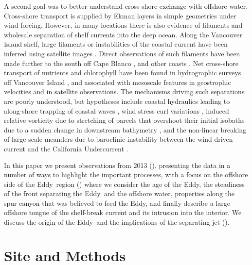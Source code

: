 \documentclass[draft]{agujournal2019}
\newcommand*{\Eddy}{{\sc Eddy}}
\begin{document}
A second goal was to better understand cross-shore exchange with offshore water.  Cross-shore transport is supplied by Ekman layers in simple geometries under wind forcing. However, in many locations there is also evidence of filaments and wholesale separation of shelf currents into the deep ocean.  Along the Vancouver Island shelf, large filaments or instabilities of the coastal current have been inferred using satellite images \cite{ikedaemery84,thomsongower98}.  Direct observations of such filaments have been made further to the south off Cape Blanco \cite{barthetal00}, and other coasts \cite[e.g.]{relvasbarton05}. Net cross-shore transport of nutrients and chlorophyll have been found in hydrographic surveys off Vancouver Island \cite{mackasyelland99}, and associated with mesoscale features in geostrophic velocities and in satellite observations.  The mechanisms driving such separations are poorly understood, but hypotheses include coastal hydraulics leading to along-shore trapping of coastal waves \cite{dalebarth01},  wind stress curl variations \cite{castelaobarth07}, induced relative vorticity due to stretching of parcels that overshoot their initial isobaths due to a sudden change in downstream bathymetry \citep{dasaro88}, and the non-linear breaking of large-scale meanders due to baroclinic instability between the wind-driven current and the California Undercurrent \cite{ikedaetal84, batteen97}.

In this paper we present observations from 2013 (), presenting the data in a number of ways to highlight the important processes, with a focus on the offshore side of the \Eddy\ region () where we consider the age of the \Eddy, the steadiness of the front separating the \Eddy\ and the offshore water, properties along the spur canyon that was believed to feed the \Eddy, and finally describe a large offshore tongue of the shelf-break current and its intrusion into the interior.  We discuss the origin of the \Eddy\ and the implications of the separating jet ().

\section{Site and Methods}
\label{sec:Site}
\end{document}
